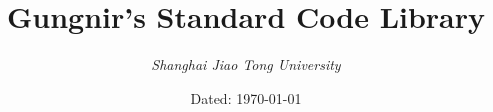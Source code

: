 \documentclass{book}
\begin{document}
	\title{\textbf{\LARGE{Gungnir's Standard Code Library}}}
	\author{\emph{Shanghai Jiao Tong University}}
	\date{Dated: \today}
	\maketitle
	\tableofcontents
	\begin{spacing}{1.0}
		
	\end{spacing}
\end{document}
